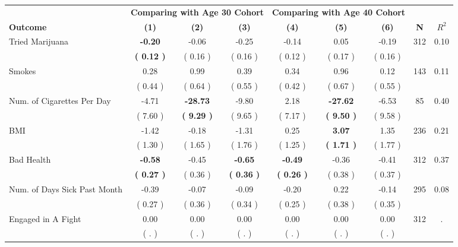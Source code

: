\begin{tabular}{lcccccccc}
\toprule
 & \multicolumn{3}{c}{\textbf{Comparing with Age 30 Cohort}} & \multicolumn{3}{c}{\textbf{Comparing with Age 40 Cohort}} & \\
\cmidrule(lr){2-4} \cmidrule(lr){5-7} 
 \textbf{Outcome} & \textbf{(1)} & \textbf{(2)} & \textbf{(3)} & \textbf{(4)} & \textbf{(5)} & \textbf{(6)} & \textbf{N} & \textbf{$ R^2$} \\
\midrule
Tried Marijuana & \textbf{    -0.20} &     -0.06 &     -0.25 &     -0.14 &      0.05 &     -0.19 & 312 &       0.10 \\ 
 & \textbf{(     0.12 )} & (     0.16 ) & (     0.16 ) & (     0.12 ) & (     0.17 ) & (     0.16 ) & \\
Smokes &      0.28 &      0.99 &      0.39 &      0.34 &      0.96 &      0.12 & 143 &       0.11 \\ 
 & (     0.44 ) & (     0.64 ) & (     0.55 ) & (     0.42 ) & (     0.67 ) & (     0.55 ) & \\
Num. of Cigarettes Per Day &     -4.71 & \textbf{   -28.73} &     -9.80 &      2.18 & \textbf{   -27.62} &     -6.53 & 85 &       0.40 \\ 
 & (     7.60 ) & \textbf{(     9.29 )} & (     9.65 ) & (     7.17 ) & \textbf{(     9.50 )} & (     9.58 ) & \\
BMI &     -1.42 &     -0.18 &     -1.31 &      0.25 & \textbf{     3.07} &      1.35 & 236 &       0.21 \\ 
 & (     1.30 ) & (     1.65 ) & (     1.76 ) & (     1.25 ) & \textbf{(     1.71 )} & (     1.77 ) & \\
Bad Health & \textbf{    -0.58} &     -0.45 & \textbf{    -0.65} & \textbf{    -0.49} &     -0.36 &     -0.41 & 312 &       0.37 \\ 
 & \textbf{(     0.27 )} & (     0.36 ) & \textbf{(     0.36 )} & \textbf{(     0.26 )} & (     0.38 ) & (     0.37 ) & \\
Num. of Days Sick Past Month &     -0.39 &     -0.07 &     -0.09 &     -0.20 &      0.22 &     -0.14 & 295 &       0.08 \\ 
 & (     0.27 ) & (     0.36 ) & (     0.34 ) & (     0.25 ) & (     0.38 ) & (     0.35 ) & \\
Engaged in A Fight &      0.00 &      0.00 &      0.00 &      0.00 &      0.00 &      0.00 & 312 &          . \\ 
 & (        . ) & (        . ) & (        . ) & (        . ) & (        . ) & (        . ) & \\

\end{tabular}
